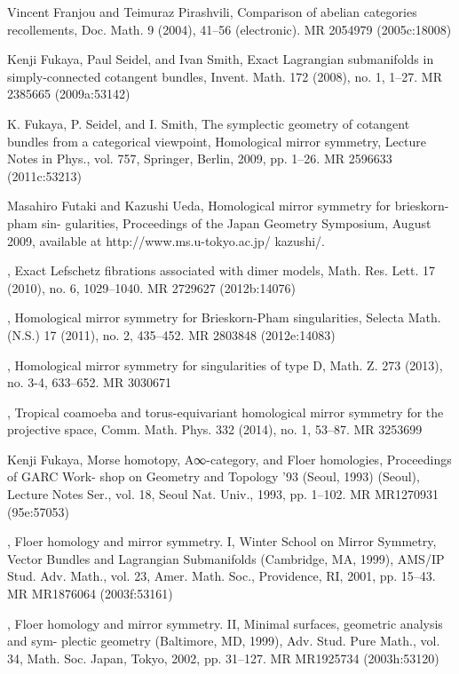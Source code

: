{\begin{list}{}{%
  \setlength{\leftmargin}{3.4em}%
  \setlength{\itemindent}{-3.4em}%
  \setlength{\itemsep}{1.5pt}%
  \setlength{\parsep}{0pt}%
  \setlength{\listparindent}{0pt}%
}
\item[{[FP04]}] Vincent Franjou and Teimuraz Pirashvili, Comparison of abelian categories recollements, Doc. Math. 9 (2004), 41--56 (electronic). MR 2054979 (2005c:18008)
\item[{[FSS08]}] Kenji Fukaya, Paul Seidel, and Ivan Smith, Exact Lagrangian submanifolds in simply-connected cotangent bundles, Invent. Math. 172 (2008), no. 1, 1--27. MR 2385665 (2009a:53142)
\item[{[FSS09]}] K. Fukaya, P. Seidel, and I. Smith, The symplectic geometry of cotangent bundles from a categorical viewpoint, Homological mirror symmetry, Lecture Notes in Phys., vol. 757, Springer, Berlin, 2009, pp. 1--26. MR 2596633 (2011c:53213)
\item[{[FU]}] Masahiro Futaki and Kazushi Ueda, Homological mirror symmetry for brieskorn-pham sin- gularities, Proceedings of the Japan Geometry Symposium, August 2009, available at http://www.ms.u-tokyo.ac.jp/ kazushi/.
\item[{[FU10]}] , Exact Lefschetz fibrations associated with dimer models, Math. Res. Lett. 17 (2010), no. 6, 1029--1040. MR 2729627 (2012b:14076)
\item[{[FU11]}] , Homological mirror symmetry for Brieskorn-Pham singularities, Selecta Math. (N.S.) 17 (2011), no. 2, 435--452. MR 2803848 (2012e:14083)
\item[{[FU13]}] , Homological mirror symmetry for singularities of type D, Math. Z. 273 (2013), no. 3-4, 633--652. MR 3030671
\item[{[FU14]}] , Tropical coamoeba and torus-equivariant homological mirror symmetry for the projective space, Comm. Math. Phys. 332 (2014), no. 1, 53--87. MR 3253699
\item[{[Fuk93]}] Kenji Fukaya, Morse homotopy, A∞-category, and Floer homologies, Proceedings of GARC Work- shop on Geometry and Topology ’93 (Seoul, 1993) (Seoul), Lecture Notes Ser., vol. 18, Seoul Nat. Univ., 1993, pp. 1--102. MR MR1270931 (95e:57053)
\item[{[Fuk01]}] , Floer homology and mirror symmetry. I, Winter School on Mirror Symmetry, Vector Bundles and Lagrangian Submanifolds (Cambridge, MA, 1999), AMS/IP Stud. Adv. Math., vol. 23, Amer. Math. Soc., Providence, RI, 2001, pp. 15--43. MR MR1876064 (2003f:53161)
\item[{[Fuk02a]}] , Floer homology and mirror symmetry. II, Minimal surfaces, geometric analysis and sym- plectic geometry (Baltimore, MD, 1999), Adv. Stud. Pure Math., vol. 34, Math. Soc. Japan, Tokyo, 2002, pp. 31--127. MR MR1925734 (2003h:53120)

\end{list}}
